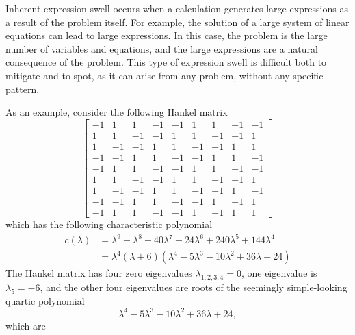 Inherent expression swell occurs when a calculation generates large expressions as a result of the problem itself. For example, the solution of a large system of linear equations can lead to large expressions. In this case, the problem is the large number of variables and equations, and the large expressions are a natural consequence of the problem. This type of expression swell is difficult both to mitigate and to spot, as it can arise from any problem, without any specific pattern.
%
\begin{example}
  As an example, consider the following Hankel matrix
  \begin{equation*}
    \begin{bmatrix}
      -1 &  1 &  1 & -1 & -1 &  1 &  1 & -1 & -1 \\
       1 &  1 & -1 & -1 &  1 &  1 & -1 & -1 &  1 \\
       1 & -1 & -1 &  1 &  1 & -1 & -1 &  1 &  1 \\
      -1 & -1 &  1 &  1 & -1 & -1 &  1 &  1 & -1 \\
      -1 &  1 &  1 & -1 & -1 &  1 &  1 & -1 & -1 \\
       1 &  1 & -1 & -1 &  1 &  1 & -1 & -1 &  1 \\
       1 & -1 & -1 &  1 &  1 & -1 & -1 &  1 & -1 \\
      -1 & -1 &  1 &  1 & -1 & -1 &  1 & -1 &  1 \\
      -1 &  1 &  1 & -1 & -1 &  1 & -1 &  1 &  1
    \end{bmatrix}
  \end{equation*}
  which has the following characteristic polynomial
  \begin{equation*}
    \begin{aligned}
      c(\lambda) &= \lambda^9 + \lambda^8 - 40\lambda^7 - 24\lambda^6 + 240\lambda^5+ 144\lambda^4 \\
      &= \lambda^4 (\lambda + 6)(\lambda^4 - 5\lambda^3 - 10\lambda^2 + 36\lambda + 24)
    \end{aligned}
  \end{equation*}
  The Hankel matrix has four zero eigenvalues $\lambda_{1,2,3,4} = 0$, one eigenvalue is $\lambda_5 = -6$, and the other four eigenvalues are roots of the seemingly simple-looking quartic polynomial
  \begin{equation*}
    \lambda^4 - 5\lambda^3 - 10\lambda^2 + 36\lambda + 24,
  \end{equation*}
  which are
  \begin{equation*}

\end{equation*}
\end{example}

